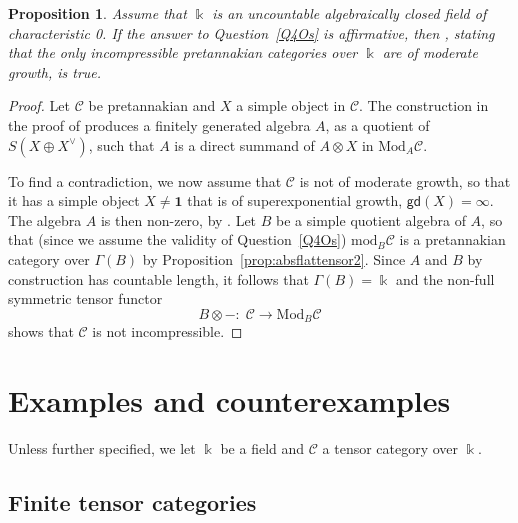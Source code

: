 \documentclass[11pt]{amsart}
\def\cC{\mathscr{C}}
\def\bk{\Bbbk}
\def\gd{\mathsf{gd}}
\def\mod{\mathrm{ mod}}
\def\Mod{\mathrm{Mod}}
\newtheorem{prop}[thm]{Proposition}
\theoremstyle{definition}
\theoremstyle{remark}
\numberwithin{equation}{section}
\newcommand{\unit}{\mathbf{1}}
\begin{document}
\begin{prop} Assume that $\Bbbk$ is an uncountable algebraically closed field of characteristic 0.
If the answer to Question~\ref{Q4Os} is affirmative, then \cite[Conjecture~C]{CEO}, stating that the only incompressible pretannakian categories over $\Bbbk$ are of moderate growth, is true.
\end{prop}
\begin{proof}
Let $\cC$ be pretannakian and $X$ a simple object in $\cC$. The construction in the proof of \cite[Lemme~2.8]{Del02} produces a finitely generated algebra $A$, as a quotient of $S(X\oplus X^\vee)$, such that $A$ is a direct summand of $A\otimes X$ in $\Mod_A\cC$. 

To find a contradiction, we now assume that $\cC$ is not of moderate growth, so that it has a simple object $X\not=\unit$ that is of superexponential growth, $\gd(X)=\infty$. The algebra $A$ is then non-zero, by \cite[Proposition~2.5]{Del02}. Let $B$ be a simple quotient algebra of $A$, so that (since we assume the validity of Question~\ref{Q4Os}) $\mod_B\cC$ is a pretannakian category over $\Gamma(B)$ by Proposition~\ref{prop:absflattensor2}. Since $A$ and $B$ by construction has countable length, it follows that $\Gamma(B)=\Bbbk$ and the non-full symmetric tensor functor
$$B\otimes -:\;\cC\to\Mod_B\cC$$
shows that $\cC$ is not incompressible.
\end{proof}










\section{Examples and counterexamples}\label{sec:examples}

Unless further specified, we let $\bk$ be a field and $\cC$ a tensor category over $\bk$.

\subsection{Finite tensor categories}
\end{document}
